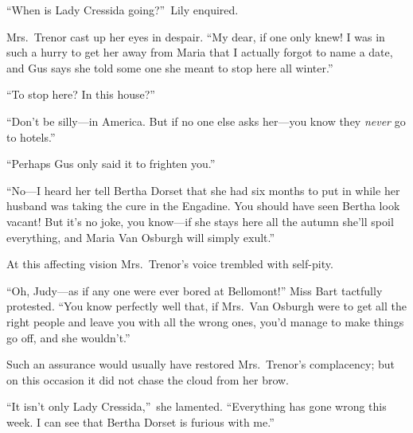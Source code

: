 \documentclass[12pt,a4paper]{book}
\begin{document}
``When is Lady Cressida going?''\ Lily enquired.





Mrs.\ Trenor cast up her eyes in despair. ``My dear, if one only
knew! I was in such a hurry to get her away from Maria that I
actually forgot to name a date, and Gus says she told some one
she meant to stop here all winter.''





``To stop here? In this house?''





``Don't be silly---in America. But if no one else asks her---you
know they \textit{never} go to hotels.''





``Perhaps Gus only said it to frighten you.''





``No---I heard her tell Bertha Dorset that she had six months to
put in while her husband was taking the cure in the Engadine. You
should have seen Bertha look vacant! But it's no joke, you
know---if she stays here all the autumn she'll spoil everything,
and Maria Van Osburgh will simply exult.''





At this affecting vision Mrs.\ Trenor's voice trembled with
self-pity.





``Oh, Judy---as if any one were ever bored at Bellomont!''
Miss Bart tactfully protested. ``You know perfectly well that,
if Mrs.\ Van Osburgh were to get all the right people and leave you
with all the wrong ones, you'd manage to make things go off,
and she wouldn't.''





Such an assurance would usually have restored Mrs.\ Trenor's
complacency; but on this occasion it did not chase the cloud from
her brow.





``It isn't only Lady Cressida,''\ she lamented. ``Everything has gone
wrong this week. I can see that Bertha Dorset is furious with
me.''
\end{document}
